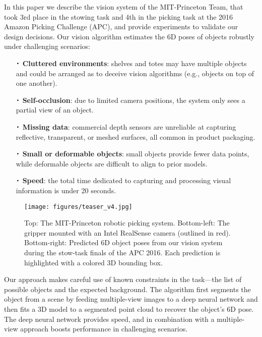 \documentclass[letterpaper, 10 pt, conference]{ieeeconf}  %
\newcommand*{\Cdot}{\raisebox{-0.25ex}{\scalebox{1.75}{$\cdot$}}}
\begin{document}
In this paper we describe the vision system of the MIT-Princeton Team, that took 3rd place in the stowing task and 4th in the picking task at the 2016 Amazon Picking Challenge (APC), and provide experiments to validate our design decisions. 
Our vision algorithm estimates the 6D poses of objects robustly under challenging scenarios:

\begin{itemize}
\item[$\Cdot$] \textbf{Cluttered environments}: shelves and totes may have multiple objects and could be arranged as to deceive vision algorithms (e.g., objects on top of one another).

\item[$\Cdot$] \textbf{Self-occlusion}: due to limited camera positions, the system only sees a partial view of an object.

\item[$\Cdot$] \textbf{Missing data}: commercial depth sensors are unreliable at capturing reflective, transparent, or meshed surfaces, all common in product packaging.

\item[$\Cdot$] \textbf{Small or deformable objects}: small objects provide fewer data points, while deformable objects are difficult to align to prior models.

\item[$\Cdot$] \textbf{Speed}: the total time dedicated to capturing and processing visual information is under 20 seconds.
\end{itemize}

\begin{figure}
\centering
  \texttt{[image: figures/teaser\_v4.jpg]}
  \caption{Top: The MIT-Princeton robotic picking system. Bottom-left: The gripper mounted with an Intel RealSense camera (outlined in red). Bottom-right: Predicted 6D object poses from our vision system during the stow-task finals of the APC 2016. Each prediction is highlighted with a colored 3D bounding box.}
  \label{fig:teaser}
\end{figure}

Our approach makes careful use of known constraints in the task---the list of possible objects and the expected background.
The algorithm first segments the object from a scene by feeding multiple-view images to a deep neural network and then fits a 3D model to a segmented point cloud to recover the object's 6D pose.
The 
deep neural network provides speed, and in combination with a multiple-view approach boosts performance in challenging scenarios.
\end{document}
